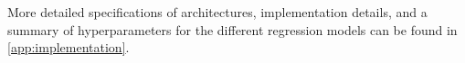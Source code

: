 \documentclass[11pt,reqno,a4paper]{amsart}
\theoremstyle{definition}
\numberwithin{equation}{section}
\DeclareMathOperator{\1}{\mathbbm{1}}
\begin{document}
More detailed specifications of architectures, implementation details, and a summary of hyperparameters for the different regression models can be found in \cref{app:implementation}.

\end{document}
